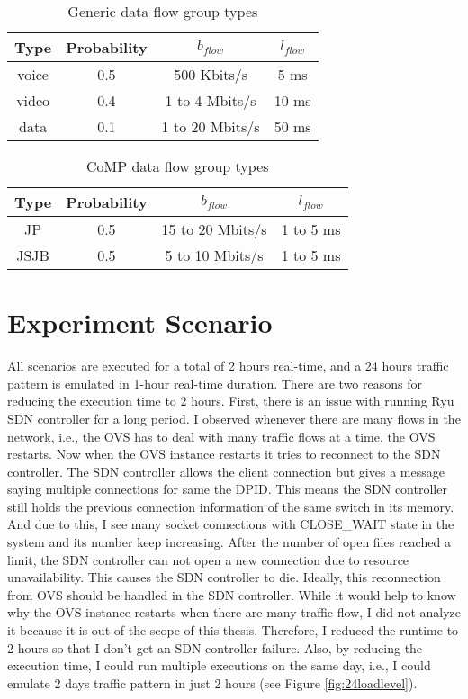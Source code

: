 \begin{table}[h!]
	\centering
	\caption{Generic data flow group types \cite{7343600}}
	\label{tab:gendfgtype}
	\begin{tabular}{c | c | c | c}
		\hline
		Type & Probability & $b_{flow}$ & $l_{flow}$\\
		\hline
		voice & 0.5 & 500 Kbits/s & 5 ms\\
		video & 0.4 & 1 to 4 Mbits/s & 10 ms\\
		data & 0.1 & 1 to 20 Mbits/s & 50 ms\\
		\hline
	\end{tabular}
\end{table}

\begin{table}[h!]
	\centering
	\caption{CoMP data flow group types \cite{MArasha}}
	\label{tab:compdfgtype}
	\begin{tabular}{c | c | c | c}
		\hline
		Type & Probability & $b_{flow}$ & $l_{flow}$\\
		\hline
		JP & 0.5 & 15 to 20 Mbits/s & 1 to 5 ms\\
		JSJB & 0.5 & 5 to 10 Mbits/s & 1 to 5 ms\\
		\hline
	\end{tabular}
\end{table}

\section{Experiment Scenario}\label{sec:expscn}
All scenarios are executed for a total of 2 hours real-time, and a 24 hours traffic pattern is emulated in 1-hour real-time duration. There are two reasons for reducing the execution time to 2 hours. First, there is an issue with running Ryu SDN controller for a long period. I observed whenever there are many flows in the network, i.e., the OVS has to deal with many traffic flows at a time, the OVS restarts. Now when the OVS instance restarts it tries to reconnect to the SDN controller. The SDN controller allows the client connection but gives a message saying multiple connections for same the DPID. This means the SDN controller still holds the previous connection information of the same switch in its memory. And due to this, I see many socket connections with CLOSE\_WAIT state in the system and its number keep increasing. After the number of open files reached a limit, the SDN controller can not open a new connection due to resource unavailability. This causes the SDN controller to die. Ideally, this reconnection from OVS should be handled in the SDN controller. While it would help to know why the OVS instance restarts when there are many traffic flow, I did not analyze it because it is out of the scope of this thesis. Therefore, I reduced the runtime to 2 hours so that I don't get an SDN controller failure. Also, by reducing the execution time, I could run multiple executions on the same day, i.e., I could emulate 2 days traffic pattern in just 2 hours (see Figure \ref{fig:24loadlevel}).

